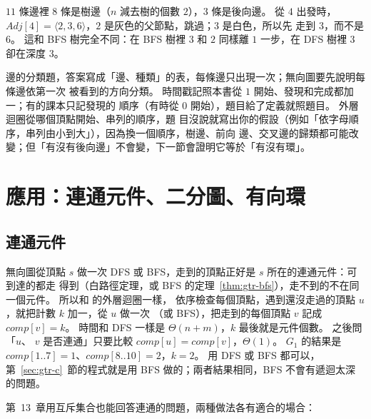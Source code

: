 $11$ 條邊裡 $8$ 條是樹邊（$n$ 減去樹的個數 $2$），$3$ 條是後向邊。 從 $4$ 出發時，
$\mathit{Adj}[4] = \langle 2, 3, 6 \rangle$，$2$ 是灰色的父節點，跳過；$3$ 是白色，所以先
走到 $3$，而不是 $6$。 這和 BFS 樹完全不同：在 BFS 樹裡 $3$ 和 $2$ 同樣離 $1$ 一步，在 DFS
樹裡 $3$ 卻在深度 $3$。

\begin{examnote}
邊的分類題，答案寫成「邊、種類」的表，每條邊只出現一次；無向圖要先說明每條邊依第一次
被看到的方向分類。 時間戳記照本書從 $1$ 開始、發現和完成都加一；有的課本只記發現的
順序（有時從 $0$ 開始），題目給了定義就照題目。 外層迴圈從哪個頂點開始、串列的順序，題
目沒說就寫出你的假設（例如「依字母順序，串列由小到大」），因為換一個順序，樹邊、前向
邊、交叉邊的歸類都可能改變；但「有沒有後向邊」不會變，下一節會證明它等於「有沒有環」。
\end{examnote}

\section{應用：連通元件、二分圖、有向環}
\label{sec:gtr-app}

\subsection{連通元件}

無向圖從頂點 $s$ 做一次 DFS 或 BFS，走到的頂點正好是 $s$ 所在的連通元件：可到達的都走
得到（白路徑定理，或 BFS 的定理~\ref{thm:gtr-bfs}），走不到的不在同一個元件。 所以和  的外層迴圈一樣，
依序檢查每個頂點，遇到還沒走過的頂點 $u$，就把計數 $k$ 加一，從 $u$ 做一次
（或 BFS），把走到的每個頂點 $v$ 記成 $\mathit{comp}[v] = k$。
時間和 DFS 一樣是 $\Theta(n + m)$，$k$ 最後就是元件個數。 之後問「$u$、
$v$ 是否連通」只要比較 $\mathit{comp}[u] = \mathit{comp}[v]$，$\Theta(1)$。 $G_1$ 的結果是
$\mathit{comp}[1..7] = 1$、$\mathit{comp}[8..10] = 2$，$k = 2$。 用 DFS 或 BFS 都可以，第~\ref{sec:gtr-c}~節的程式就是用 BFS 做的；兩者結果相同，BFS 不會有遞迴太深的問題。

第~13~章用互斥集合也能回答連通的問題，兩種做法各有適合的場合：

